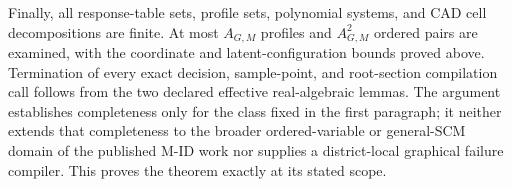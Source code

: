 Finally, all response-table sets, profile sets, polynomial systems, and CAD cell decompositions are finite.  At most \(A_{G,M}\) profiles and \(A_{G,M}^2\) ordered pairs are examined, with the coordinate and latent-configuration bounds proved above.  Termination of every exact decision, sample-point, and root-section compilation call follows from the two declared effective real-algebraic lemmas.  The argument establishes completeness only for the class fixed in the first paragraph; it neither extends that completeness to the broader ordered-variable or general-SCM domain of the published M-ID work nor supplies a district-local graphical failure compiler.  This proves the theorem exactly at its stated scope.